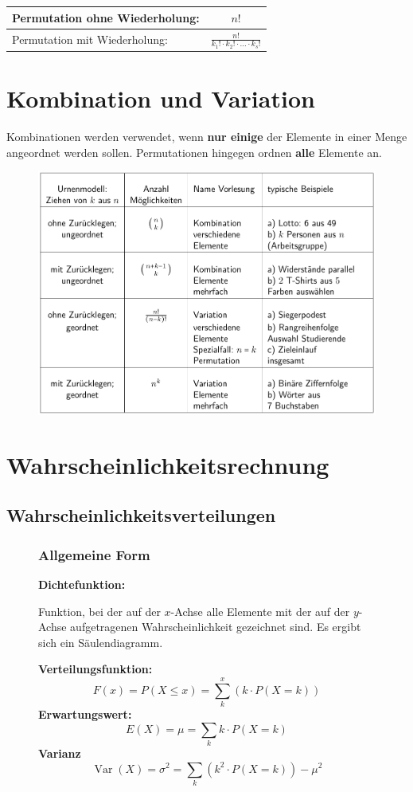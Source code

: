 \documentclass[12pt, a4paper]{scrreprt}
\begin{document}
\begin{tabular}{lc}
  \toprule
  Permutation ohne Wiederholung: & \(n!\)\\
  \midrule
  Permutation mit Wiederholung: & \(\displaystyle{\frac{n!}{k_1! \cdot k_2! \cdot \ldots \cdot k_s!}}\)\\
  \bottomrule
\end{tabular}

\section{Kombination und Variation}

Kombinationen werden verwendet, wenn \textbf{nur einige} der Elemente in einer Menge angeordnet werden sollen. Permutationen hingegen ordnen \textbf{alle} Elemente an.

\begin{figure}[H]
  \centering
  \includegraphics[width=\textwidth]{Grafiken/Kombinatorik}
\end{figure}

\section{Wahrscheinlichkeitsrechnung}

\subsection{Wahrscheinlichkeitsverteilungen}

\begin{figure}[H]
  \subsubsection{Allgemeine Form}
  \textbf{Dichtefunktion:}

  Funktion, bei der auf der \(x\)-Achse alle Elemente mit der auf der \(y\)-Achse aufgetragenen Wahrscheinlichkeit gezeichnet sind. Es ergibt sich ein Säulendiagramm.

  \textbf{Verteilungsfunktion:}
  \[F(x) = P(X \leq x) = \sum_k^x(k \cdot P(X=k))\]
  \textbf{Erwartungswert:}
  \[E(X) = \mu = \sum_k k \cdot P(X=k)\]
  \textbf{Varianz}
  \[\operatorname{Var}(X) = \sigma^2 = \sum_k {(k^2 \cdot P(X=k) )} - \mu^2\]
\end{figure}
\end{document}
